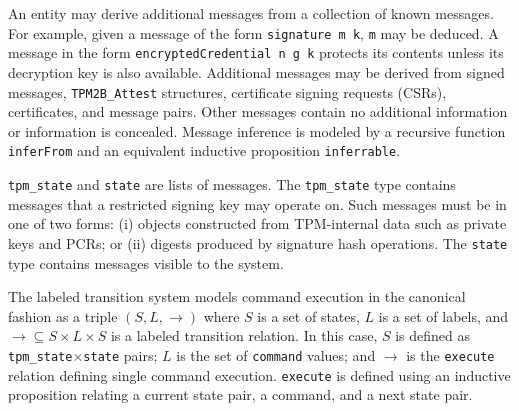 \documentclass[runningheads]{llncs}
\begin{document}
An entity may derive additional messages from a collection of known
messages.  For example, given a message of the form
\verb|signature m k|, \verb|m| may be deduced.  A message in the form
\verb|encryptedCredential n g k| protects its contents unless its
decryption key is also available.  Additional messages may be derived
from signed messages, \verb|TPM2B_Attest| structures, certificate
signing requests (CSRs), certificates, and message pairs. Other
messages contain no additional information or information is
concealed.  Message inference is modeled by a
recursive function \verb|inferFrom| and an equivalent inductive
proposition \verb|inferrable|.

\verb|tpm_state| and \verb|state| are lists of messages. The
\verb|tpm_state| type contains messages that a restricted signing key
may operate on. Such messages must be in one of two forms: (i) objects
constructed from TPM-internal data such as private keys and PCRs; or
(ii) digests produced by signature hash operations.  The \verb|state|
type contains messages visible to the system.

The labeled transition system models command execution in the
canonical fashion as a triple $(S,L,\rightarrow)$ where $S$ is a set
of states, $L$ is a set of labels, and
$\rightarrow \subseteq S \times L \times S$ is a labeled transition
relation.  In this case, $S$ is defined as \verb|tpm_state|$\times$\verb|state|
pairs; $L$ is the set of \verb|command| values; and $\rightarrow$ is
the \verb|execute| relation defining single command execution.
\verb|execute| is defined using an inductive proposition relating a
current state pair, a command, and a next state pair.


\end{document}
